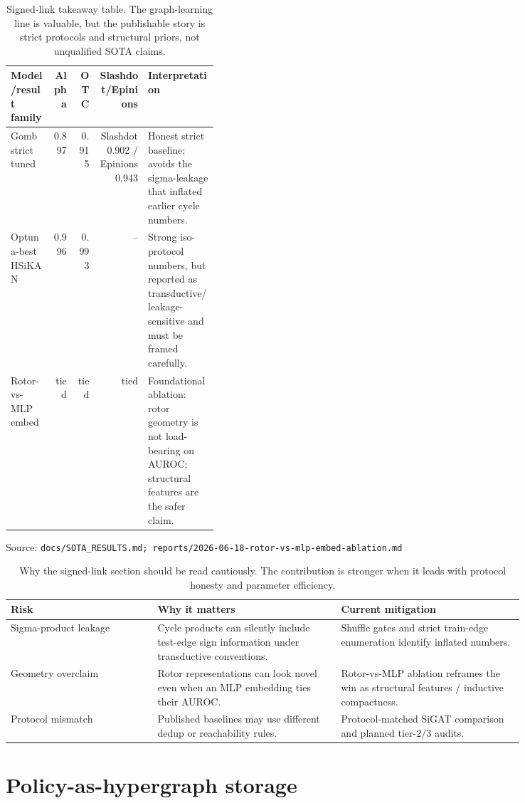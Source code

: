 \documentclass[10pt]{article}
\newcommand{\src}[1]{\par\footnotesize\textcolor{gray!70!black}{Source: \nolinkurl{#1}}\normalsize}
\begin{document}
\begin{table}[!htbp]\centering\small
\begin{tabular}{lrrrp{0.34\linewidth}}
\toprule
Model/result family & Alpha & OTC & Slashdot/Epinions & Interpretation \\
\midrule
Gomb strict tuned & 0.897 & 0.915 & Slashdot 0.902 / Epinions 0.943 &
Honest strict baseline; avoids the sigma-leakage that inflated earlier cycle
numbers. \\
Optuna-best HSiKAN & 0.996 & 0.993 & -- & Strong iso-protocol numbers, but
reported as transductive/leakage-sensitive and must be framed carefully. \\
Rotor-vs-MLP embed & tied & tied & tied & Foundational ablation: rotor
geometry is not load-bearing on AUROC; structural features are the safer claim. \\
\bottomrule
\end{tabular}
\caption{Signed-link takeaway table. The graph-learning line is valuable, but
the publishable story is strict protocols and structural priors, not unqualified
SOTA claims.}
\src{docs/SOTA_RESULTS.md; reports/2026-06-18-rotor-vs-mlp-embed-ablation.md}
\end{table}

\begin{table}[!htbp]\centering\small
\begin{tabular}{p{0.24\linewidth}p{0.30\linewidth}p{0.30\linewidth}}
\toprule
Risk & Why it matters & Current mitigation \\
\midrule
Sigma-product leakage & Cycle products can silently include test-edge sign
information under transductive conventions. & Shuffle gates and strict
train-edge enumeration identify inflated numbers. \\
Geometry overclaim & Rotor representations can look novel even when an MLP
embedding ties their AUROC. & Rotor-vs-MLP ablation reframes the win as
structural features / inductive compactness. \\
Protocol mismatch & Published baselines may use different dedup or reachability
rules. & Protocol-matched SiGAT comparison and planned tier-2/3 audits. \\
\bottomrule
\end{tabular}
\caption{Why the signed-link section should be read cautiously. The contribution
is stronger when it leads with protocol honesty and parameter efficiency.}
\end{table}

\section{Policy-as-hypergraph storage}
\end{document}
